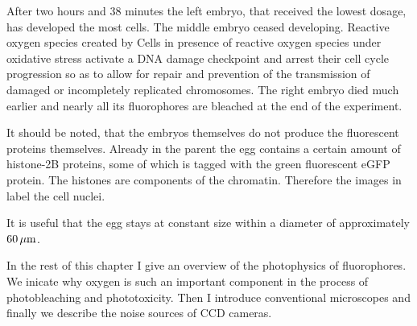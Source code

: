 After two hours and 38 minutes the left embryo, that received the
lowest dosage, has developed the most cells. The middle embryo ceased
developing. Reactive oxygen species created by Cells in presence of
reactive oxygen species under oxidative stress activate a DNA damage
checkpoint and arrest their cell cycle progression so as to allow for
repair and prevention of the transmission of damaged or incompletely
replicated chromosomes. The right embryo died much earlier and nearly
all its fluorophores are bleached at the end of the experiment.



It should be noted, that the embryos themselves do not produce the    
fluorescent proteins themselves. Already in the parent the egg
contains a certain amount of histone-2B proteins, some of which is
tagged with the green fluorescent eGFP protein. The histones are
components of the chromatin. Therefore the images in
 label the cell nuclei.

It is useful that the egg stays at constant size within a diameter   
of approximately $\unit[60]{\mu m}$.

  


In the rest of this chapter I give an overview of the photophysics of  
fluorophores. We inicate why oxygen is such an important component in
the process of photobleaching and phototoxicity.  Then I introduce
conventional microscopes and finally we describe the noise sources of
CCD cameras.



